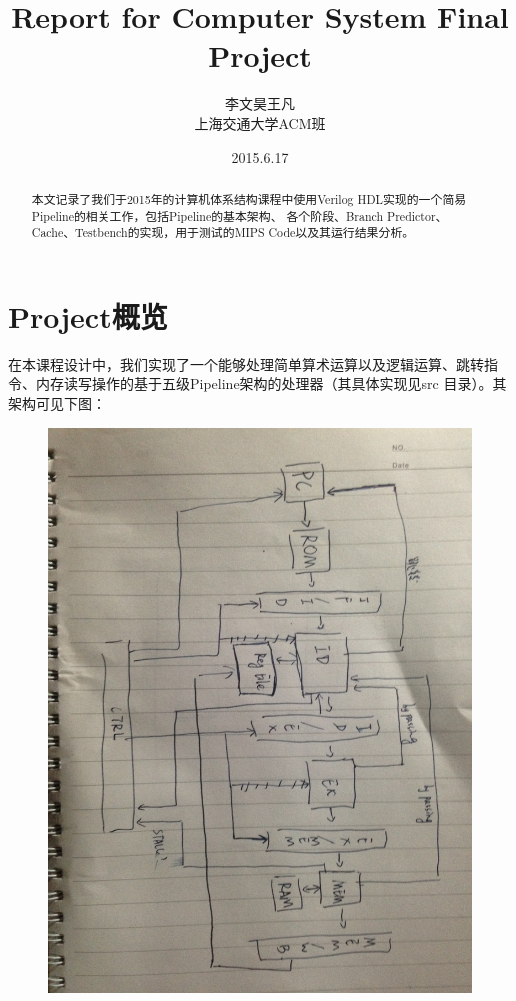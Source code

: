 \documentclass[titlepage]{article}
\begin{document}
\title{Report for Computer System Final Project}
\author{李文昊\quad 王凡\\ 上海交通大学ACM班}
\date{2015.6.17}
\maketitle

\kaishu

\begin{abstract}
\quad \quad 本文记录了我们于2015年的计算机体系结构课程中使用Verilog HDL实现的一个简易Pipeline的相关工作，包括Pipeline的基本架构、
各个阶段、Branch Predictor、Cache、Testbench的实现，用于测试的MIPS Code以及其运行结果分析。
\end{abstract}

\tableofcontents
\newpage

\section{Project概览}
在本课程设计中，我们实现了一个能够处理简单算术运算以及逻辑运算、跳转指令、内存读写操作的基于五级Pipeline架构的处理器（其具体实现见src
目录）。其架构可见下图：
\begin{figure}[H]
\includegraphics[height=.5\textheight]{constructure.JPG}
\end{figure}
\end{document}
